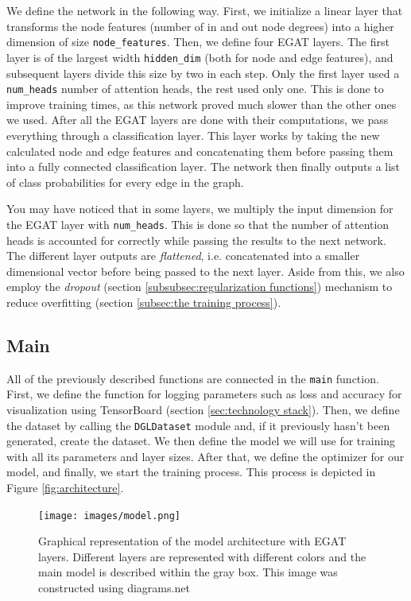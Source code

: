 \documentclass[times, utf8, diplomski, english]{fer_eng}
\begin{document}
We define the network in the following way. First, we initialize a linear layer that transforms the node features (number of in and out node degrees) into a higher dimension of size \texttt{node\_features}. Then, we define four EGAT layers. The first layer is of the largest width \texttt{hidden\_dim} (both for node and edge features), and subsequent layers divide this size by two in each step. Only the first layer used a \texttt{num\_heads} number of attention heads, the rest used only one. This is done to improve training times, as this network proved much slower than the other ones we used. After all the EGAT layers are done with their computations, we pass everything through a classification layer. This layer works by taking the new calculated node and edge features and concatenating them before passing them into a fully connected classification layer. The network then finally outputs a list of class probabilities for every edge in the graph.

You may have noticed that in some layers, we multiply the input dimension for the EGAT layer with \texttt{num\_heads}. This is done so that the number of attention heads is accounted for correctly while passing the results to the next network. The different layer outputs are \textit{flattened}, i.e. concatenated into a smaller dimensional vector before being passed to the next layer. Aside from this, we also employ the \textit{dropout} (section \ref{subsubsec:regularization functions}) mechanism to reduce overfitting (section \ref{subsec:the training process}).

\subsection{Main}

All of the previously described functions are connected in the \texttt{main} function. First, we define the function for logging parameters such as loss and accuracy for visualization using TensorBoard (section \ref{sec:technology stack}). Then, we define the dataset by calling the \texttt{DGLDataset} module and, if it previously hasn't been generated, create the dataset. We then define the model we will use for training with all its parameters and layer sizes. After that, we define the optimizer for our model, and finally, we start the training process. This process is depicted in Figure \ref{fig:architecture}.

\begin{figure}
	\centering
	\texttt{[image: images/model.png]}
	\caption[Model]{Graphical representation of the model architecture with EGAT layers. Different layers are represented with different colors and the main model is described within the gray box. This image was constructed using diagrams.net\footnotemark{}}
	\label{fig:model}
\end{figure}
\end{document}
